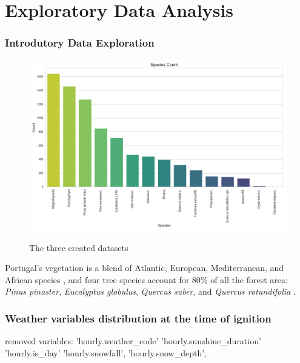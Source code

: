 \chapter{Exploratory Data Analysis}
\label{sec:eda}

\subsection{Introdutory Data Exploration}

\begin{figure}[H]
	\caption{The three created datasets}
	\centering
	\includegraphics[width=\textwidth]{chapter-images/5_1-eda/species_count.png}
	\label{fig:species_count}
\end{figure}


Portugal's vegetation is a blend of Atlantic, European, Mediterranean, and African species \cite{britannica_portugal_climate}, and four tree species account for 80\% of all the forest area: \textit{Pinus pinaster}, \textit{Eucalyptus globulus}, \textit{Quercus suber}, and \textit{Quercus rotundifolia} \cite{Marques2011}.


\subsection{Weather variables distribution at the time of ignition}
removed variables: 'hourly.weather\_code' 'hourly.sunshine\_duration' 'hourly.is\_day' 'hourly.snowfall',
'hourly.snow\_depth', 


